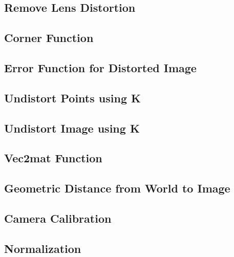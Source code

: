 \documentclass[conference]{IEEEtran}
\begin{document}
\newpage

\newpage
\appendix
\subsection{Remove Lens Distortion}

\subsection{Corner Function}

\subsection{Error Function for Distorted Image}

\subsection{Undistort Points using K}

\subsection{Undistort Image using K}

\subsection{Vec2mat Function}

\subsection{Geometric Distance from World to Image}

\subsection{Camera Calibration}

\subsection{Normalization}









\end{document}
